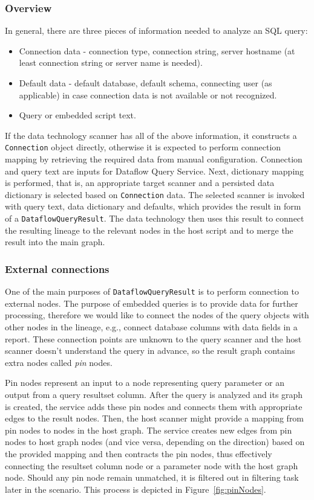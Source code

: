 \subsubsection{Overview}
In general, there are three pieces of information needed to analyze an SQL query:
\begin{itemize}
    \item Connection data - connection type, connection string, server hostname (at least connection string or server name is needed).
    \item Default data - default database, default schema, connecting user (as applicable) in case connection data is not available or not recognized.
    \item Query or embedded script text.
\end{itemize}
If the data technology scanner has all of the above information, it constructs a \texttt{Connection} object directly, otherwise it is expected to perform connection mapping by retrieving the required data from manual configuration. Connection and query text are inputs for Dataflow Query Service. Next, dictionary mapping is performed, that is, an appropriate target scanner and a persisted data dictionary is selected based on \texttt{Connection} data. The selected scanner is invoked with query text, data dictionary and defaults, which provides the result in form of a \texttt{DataflowQueryResult}. The data technology then uses this result to connect the resulting lineage to the relevant nodes in the host script and to merge the result into the main graph.

\subsubsection{External connections}
One of the main purposes of \texttt{DataflowQueryResult} is to perform connection to external nodes. The purpose of embedded queries is to provide data for further processing, therefore we would like to connect the nodes of the query objects with other nodes in the lineage, e.g., connect database columns with data fields in a report. These connection points are unknown to the query scanner and the host scanner doesn't understand the query in advance, so the result graph contains extra nodes called \textit{pin} nodes.
\par
Pin nodes represent an input to a node representing query parameter or an output from a query resultset column. After the query is analyzed and its graph is created, the service adds these pin nodes and connects them with appropriate edges to the result nodes. Then, the host scanner might provide a mapping from pin nodes to nodes in the host graph. The service creates new edges from pin nodes to host graph nodes (and vice versa, depending on the direction) based on the provided mapping and then contracts the pin nodes, thus effectively connecting the resultset column node or a parameter node with the host graph node. Should any pin node remain unmatched, it is filtered out in filtering task later in the scenario. This process is depicted in Figure~\ref{fig:pinNodes}.

